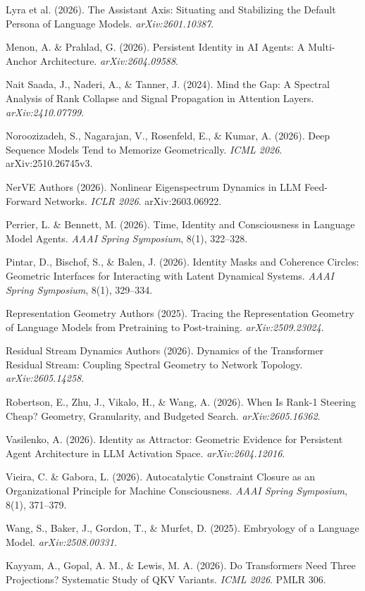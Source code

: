 \documentclass[12pt]{article}
\begin{document}
Lyra et al. (2026). The Assistant Axis: Situating and Stabilizing the Default Persona of Language Models. \textit{arXiv:2601.10387}.

Menon, A. \& Prahlad, G. (2026). Persistent Identity in AI Agents: A Multi-Anchor Architecture. \textit{arXiv:2604.09588}.

Nait Saada, J., Naderi, A., \& Tanner, J. (2024). Mind the Gap: A Spectral Analysis of Rank Collapse and Signal Propagation in Attention Layers. \textit{arXiv:2410.07799}.

Noroozizadeh, S., Nagarajan, V., Rosenfeld, E., \& Kumar, A. (2026). Deep Sequence Models Tend to Memorize Geometrically. \textit{ICML 2026}. arXiv:2510.26745v3.

NerVE Authors (2026). Nonlinear Eigenspectrum Dynamics in LLM Feed-Forward Networks. \textit{ICLR 2026}. arXiv:2603.06922.

Perrier, L. \& Bennett, M. (2026). Time, Identity and Consciousness in Language Model Agents. \textit{AAAI Spring Symposium}, 8(1), 322–328.

Pintar, D., Bischof, S., \& Balen, J. (2026). Identity Masks and Coherence Circles: Geometric Interfaces for Interacting with Latent Dynamical Systems. \textit{AAAI Spring Symposium}, 8(1), 329–334.

Representation Geometry Authors (2025). Tracing the Representation Geometry of Language Models from Pretraining to Post-training. \textit{arXiv:2509.23024}.

Residual Stream Dynamics Authors (2026). Dynamics of the Transformer Residual Stream: Coupling Spectral Geometry to Network Topology. \textit{arXiv:2605.14258}.

Robertson, E., Zhu, J., Vikalo, H., \& Wang, A. (2026). When Is Rank-1 Steering Cheap? Geometry, Granularity, and Budgeted Search. \textit{arXiv:2605.16362}.

Vasilenko, A. (2026). Identity as Attractor: Geometric Evidence for Persistent Agent Architecture in LLM Activation Space. \textit{arXiv:2604.12016}.

Vieira, C. \& Gabora, L. (2026). Autocatalytic Constraint Closure as an Organizational Principle for Machine Consciousness. \textit{AAAI Spring Symposium}, 8(1), 371–379.

Wang, S., Baker, J., Gordon, T., \& Murfet, D. (2025). Embryology of a Language Model. \textit{arXiv:2508.00331}.

Kayyam, A., Gopal, A. M., \& Lewis, M. A. (2026). Do Transformers Need Three Projections? Systematic Study of QKV Variants. \textit{ICML 2026}. PMLR 306.
\end{document}
